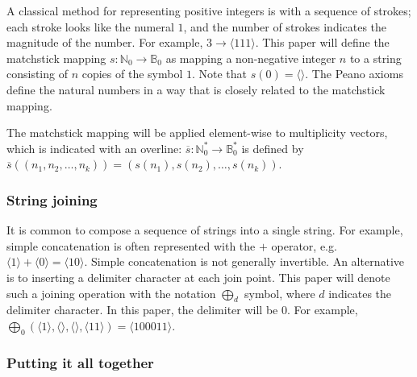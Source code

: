 \documentclass[12pt,reqno]{article}
\begin{document}
A classical method for representing positive integers is with a sequence of strokes; each stroke looks like the numeral $1$, and the number of strokes indicates the magnitude of the number. For example, $3 \rightarrow \langle 111 \rangle$. This paper will define the matchstick mapping $s : \mathbb{N}_0 \rightarrow \mathbb{B}_0$ as mapping a non-negative integer $n$ to a string consisting of $n$ copies of the symbol $1$. Note that $s(0) = \langle \rangle$. The Peano axioms define the natural numbers in a way that is closely related to the matchstick mapping.

The matchstick mapping will be applied element-wise to multiplicity vectors, which is indicated with an overline: $\overline{s} : \mathbb{N}_0^{*} \rightarrow \mathbb{B}_0^{*}$ is defined by $\overline{s}((n_1, n_2, \ldots, n_k)) = (s(n_1), s(n_2), \ldots, s(n_k))$.

\subsubsection{String joining}

It is common to compose a sequence of strings into a single string. For example, simple concatenation is often represented with the $+$ operator, e.g. $\langle 1 \rangle + \langle 0 \rangle = \langle 10 \rangle$. Simple concatenation is not generally invertible. An alternative is to inserting a delimiter character at each join point. This paper will denote such a joining operation with the notation $\bigoplus_d$ symbol, where $d$ indicates the delimiter character. In this paper, the delimiter will be $0$. For example, $\bigoplus_0 (\langle 1 \rangle, \langle \rangle, \langle \rangle, \langle 11 \rangle) = \langle 100011 \rangle$. 

\subsubsection{Putting it all together}
\end{document}

